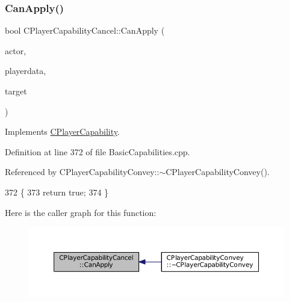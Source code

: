 \subsubsection{\texorpdfstring{Can\+Apply()}{CanApply()}}
{\footnotesize\ttfamily bool C\+Player\+Capability\+Cancel\+::\+Can\+Apply (\begin{DoxyParamCaption}\item[{std\+::shared\+\_\+ptr$<$ \hyperlink{classCPlayerAsset}{C\+Player\+Asset} $>$}]{actor,  }\item[{std\+::shared\+\_\+ptr$<$ \hyperlink{classCPlayerData}{C\+Player\+Data} $>$}]{playerdata,  }\item[{std\+::shared\+\_\+ptr$<$ \hyperlink{classCPlayerAsset}{C\+Player\+Asset} $>$}]{target }\end{DoxyParamCaption})\hspace{0.3cm}{\ttfamily [virtual]}}



Implements \hyperlink{classCPlayerCapability_ae96263e0950f496492f8baeb877b9554}{C\+Player\+Capability}.



Definition at line 372 of file Basic\+Capabilities.\+cpp.



Referenced by C\+Player\+Capability\+Convey\+::$\sim$\+C\+Player\+Capability\+Convey().


\begin{DoxyCode}
372                                                                                                            
                                                   \{
373     \textcolor{keywordflow}{return} \textcolor{keyword}{true};
374 \}
\end{DoxyCode}
Here is the caller graph for this function\+:\nopagebreak
\begin{figure}[H]
\begin{center}
\leavevmode
\includegraphics[width=350pt]{classCPlayerCapabilityCancel_a0221e4e768c998cb46f1dbc757647ec1_icgraph}
\end{center}
\end{figure}
\hypertarget{classCPlayerCapabilityCancel_a8b4ad4a4983b01e458d439cf68fd2ba9}{}\label{classCPlayerCapabilityCancel_a8b4ad4a4983b01e458d439cf68fd2ba9} 
